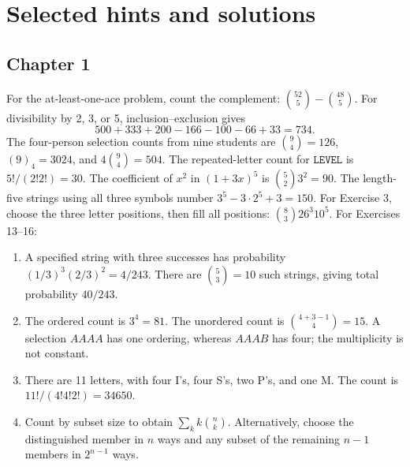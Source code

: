 \chapter{Selected hints and solutions}

\section*{Chapter 1}
For the at-least-one-ace problem, count the complement: $\binom{52}{5}-\binom{48}{5}$. For divisibility by 2, 3, or 5, inclusion--exclusion gives
\[
500+333+200-166-100-66+33=734.
\]
The four-person selection counts from nine students are
$\binom94=126$, $(9)_4=3024$, and $4\binom94=504$.
The repeated-letter count for $\texttt{LEVEL}$ is $5!/(2!2!)=30$.
The coefficient of $x^2$ in $(1+3x)^5$ is $\binom52 3^2=90$.
The length-five strings using all three symbols number
$3^5-3\cdot2^5+3=150$.
For Exercise 3, choose the three letter positions, then fill all positions:
$\binom83 26^3 10^5$.
For Exercises 13--16:
\begin{enumerate}[start=13]
 \item A specified string with three successes has probability
 $(1/3)^3(2/3)^2=4/243$. There are $\binom53=10$ such strings,
 giving total probability $40/243$.
 \item The ordered count is $3^4=81$. The unordered count is
 $\binom{4+3-1}{4}=15$. A selection $AAAA$ has one ordering,
 whereas $AAAB$ has four; the multiplicity is not constant.
 \item There are 11 letters, with four I's, four S's, two P's,
 and one M. The count is $11!/(4!4!2!)=34650$.
 \item Count by subset size to obtain $\sum_k k\binom nk$.
 Alternatively, choose the distinguished member in $n$ ways and
 any subset of the remaining $n-1$ members in $2^{n-1}$ ways.
\end{enumerate}

